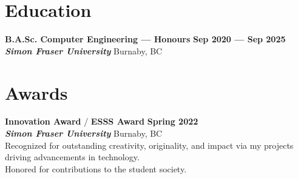 \documentclass[letterpaper,11pt]{article}
\newcommand{\school} [5] {
    {\textbf{#3} \hfill \textbf{#4 --- #5}\\ \textbf{\emph{#1}} \hfill #2\\}
}
\begin{document}
    \section{Education}
    \school{Simon Fraser University}{Burnaby, BC}{B.A.Sc. Computer Engineering --- Honours}{Sep 2020}{Sep 2025}

    \section{Awards}
    \textbf{Innovation Award} / \textbf{ESSS Award} \hfill \textbf{Spring 2022}\\
    \textbf{\emph{Simon Fraser University}}  \hfill Burnaby, BC\\
    Recognized for outstanding creativity, originality, and impact via my projects driving advancements in technology.\\
    Honored for contributions to the student society.\\
\end{document}

